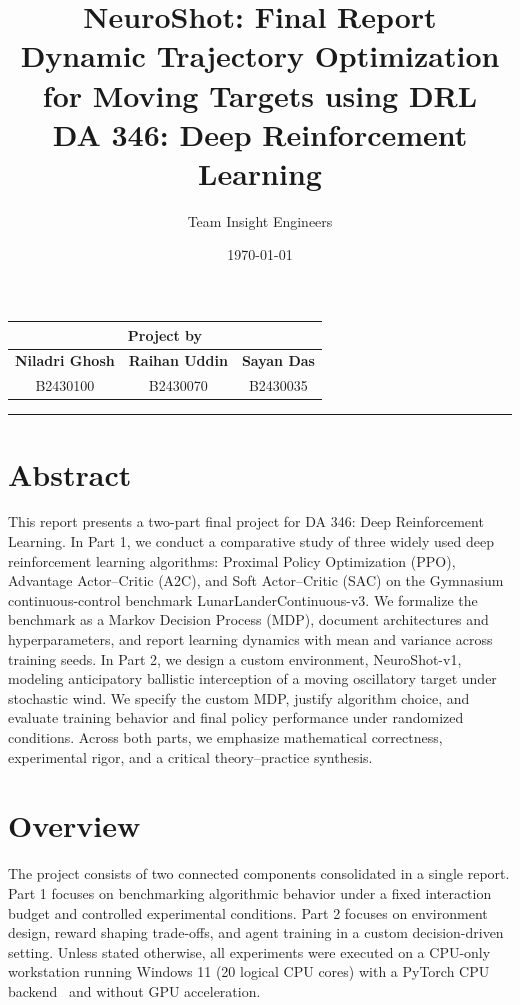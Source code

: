 \documentclass[a4paper,11pt,notitlepage]{report}
\title{
    \textbf{\Huge NeuroShot: Final Report} \\
    \Large Dynamic Trajectory Optimization for Moving Targets using DRL \\
    \vspace{0.5cm}
    \normalsize DA 346: Deep Reinforcement Learning
}
\author{Team Insight Engineers}
\date{\today}
\begin{document}
\fontsize{11}{15}\selectfont

\makeatletter
\renewcommand*{\theHfigure}{\arabic{figure}}
\renewcommand*{\theHtable}{\arabic{table}}
\makeatother

\maketitle

\begin{center}
    \begin{tabular*}{0.85\textwidth}{@{\extracolsep{\fill}}ccc}
        \multicolumn{3}{c}{\large Project by} \\ [0.5ex] 
        \midrule 
        \textbf{Niladri Ghosh} & \textbf{Raihan Uddin} & \textbf{Sayan Das} \\
        B2430100 & B2430070 & B2430035 \\
    \end{tabular*}
\end{center}
\hrule
\vspace{1cm}

\section*{\centering Abstract}
This report presents a two-part final project for DA 346: Deep Reinforcement Learning. In Part 1, we conduct a comparative study of three widely used deep reinforcement learning algorithms: Proximal Policy Optimization (PPO), Advantage Actor--Critic (A2C), and Soft Actor--Critic (SAC) on the Gymnasium continuous-control benchmark LunarLanderContinuous\allowbreak -v3. We formalize the benchmark as a Markov Decision Process (MDP), document architectures and hyperparameters, and report learning dynamics with mean and variance across training seeds. In Part 2, we design a custom environment, NeuroShot-v1, modeling anticipatory ballistic interception of a moving oscillatory target under stochastic wind. We specify the custom MDP, justify algorithm choice, and evaluate training behavior and final policy performance under randomized conditions. Across both parts, we emphasize mathematical correctness, experimental rigor, and a critical theory--practice synthesis.

\section*{\centering Overview}
The project consists of two connected components consolidated in a single report. Part 1 focuses on benchmarking algorithmic behavior under a fixed interaction budget and controlled experimental conditions. Part 2 focuses on environment design, reward shaping trade-offs, and agent training in a custom decision-driven setting. Unless stated otherwise, all experiments were executed on a CPU-only workstation running Windows 11 (20 logical CPU cores) with a PyTorch CPU backend~\cite{pytorch} and without GPU acceleration.
\end{document}
